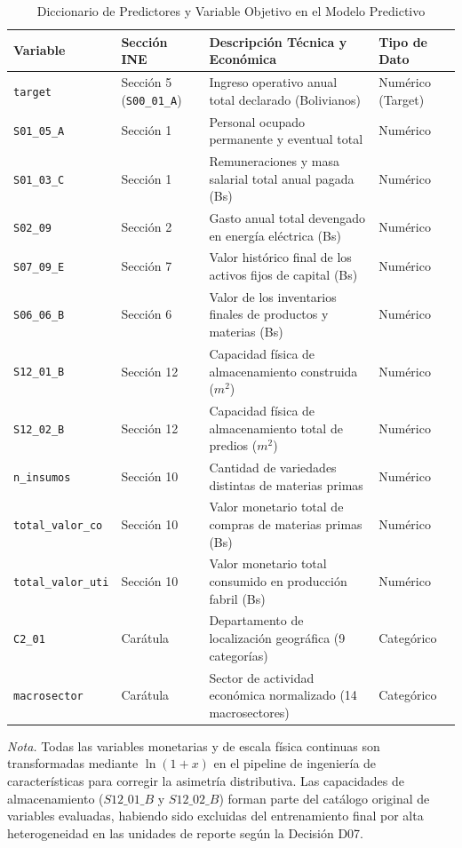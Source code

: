 \begin{table}[htbp]
\centering
\caption{Diccionario de Predictores y Variable Objetivo en el Modelo Predictivo}
\label{tab:variables_modelo}
\footnotesize
\setlength{\tabcolsep}{4.5pt}
\begin{tabularx}{\textwidth}{l l >{\raggedright\arraybackslash}X l}
\toprule
\textbf{Variable} & \textbf{Sección INE} & \textbf{Descripción Técnica y Económica} & \textbf{Tipo de Dato} \\
\midrule
\texttt{target} & Sección 5 (\texttt{S00\_01\_A}) & Ingreso operativo anual total declarado (Bolivianos) & Numérico (Target) \\
\texttt{S01\_05\_A} & Sección 1 & Personal ocupado permanente y eventual total & Numérico \\
\texttt{S01\_03\_C} & Sección 1 & Remuneraciones y masa salarial total anual pagada (Bs) & Numérico \\
\texttt{S02\_09} & Sección 2 & Gasto anual total devengado en energía eléctrica (Bs) & Numérico \\
\texttt{S07\_09\_E} & Sección 7 & Valor histórico final de los activos fijos de capital (Bs) & Numérico \\
\texttt{S06\_06\_B} & Sección 6 & Valor de los inventarios finales de productos y materias (Bs) & Numérico \\
\texttt{S12\_01\_B} & Sección 12 & Capacidad física de almacenamiento construida ($m^2$) & Numérico \\
\texttt{S12\_02\_B} & Sección 12 & Capacidad física de almacenamiento total de predios ($m^2$) & Numérico \\
\texttt{n\_insumos} & Sección 10 & Cantidad de variedades distintas de materias primas & Numérico \\
\texttt{total\_valor\_co} & Sección 10 & Valor monetario total de compras de materias primas (Bs) & Numérico \\
\texttt{total\_valor\_uti}& Sección 10 & Valor monetario total consumido en producción fabril (Bs)& Numérico \\
\texttt{C2\_01} & Carátula & Departamento de localización geográfica (9 categorías) & Categórico \\
\texttt{macrosector} & Carátula & Sector de actividad económica normalizado (14 macrosectores)& Categórico \\
\bottomrule
\end{tabularx}
\vspace{2mm}
\raggedright\footnotesize
\textit{Nota.} Todas las variables monetarias y de escala física continuas son transformadas mediante $\ln(1+x)$ en el pipeline de ingeniería de características para corregir la asimetría distributiva. Las capacidades de almacenamiento ($S12\_01\_B$ y $S12\_02\_B$) forman parte del catálogo original de variables evaluadas, habiendo sido excluidas del entrenamiento final por alta heterogeneidad en las unidades de reporte según la Decisión D07.
\end{table}
